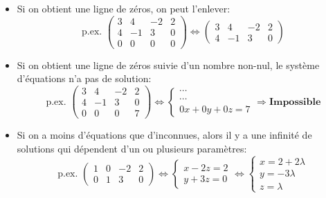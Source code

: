 \begin{remark}
\begin{itemize}
\item Si on obtient une ligne de zéros, on peut l'enlever:
\[\text{p.ex. }  \left(\begin{array}{ccc|c} 3 & 4 & -2 & 2 \\ 4 & -1 & 3 & 0 \\ 0 & 0 & 0 & 0 \end{array}\right) \Leftrightarrow  \left(\begin{array}{ccc|c} 3 & 4 & -2 & 2 \\ 4 & -1 & 3 & 0 \end{array}\right) \]
\item Si on obtient une ligne de zéros suivie d'un nombre non-nul, le système d'équations n'a pas de solution:
\[\text{p.ex. }  \left(\begin{array}{ccc|c} 3 & 4 & -2 & 2 \\ 4 & -1 & 3 & 0 \\ 0 & 0 & 0 & 7 \end{array}\right) \Leftrightarrow  \begin{cases} \cdots \\ \cdots \\ 0x + 0y + 0z = 7 \end{cases} \Rightarrow \textbf{Impossible} \]
\item Si on a moins d'équations que d'inconnues, alors il y a une infinité de solutions qui dépendent d'un ou plusieurs paramètres:
\[\text{p.ex. }  \left(\begin{array}{ccc|c} 1 & 0 & -2 & 2 \\ 0 & 1 & 3 & 0 \end{array}\right) \Leftrightarrow  \begin{cases} x - 2z = 2 \\ y + 3z = 0 \end{cases} \Leftrightarrow  \begin{cases} x = 2 + 2\lambda \\ y = -3\lambda \\ z = \lambda \end{cases} \]
\end{itemize}
\end{remark}
